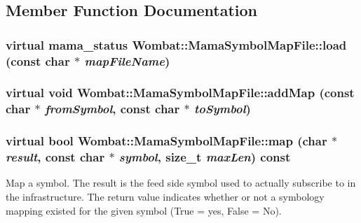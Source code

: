 \subsection{Member Function Documentation}
\hypertarget{classWombat_1_1MamaSymbolMapFile_a1a3f81e006bb46a98cb0920308d7c667}{
\subsubsection[{load}]{\setlength{\rightskip}{0pt plus 5cm}virtual mama\_\-status Wombat::MamaSymbolMapFile::load (const char $\ast$ {\em mapFileName})}}
\label{classWombat_1_1MamaSymbolMapFile_a1a3f81e006bb46a98cb0920308d7c667}
\hypertarget{classWombat_1_1MamaSymbolMapFile_ae5126c3985633b7bf9c7f5b06d505e45}{
\subsubsection[{addMap}]{\setlength{\rightskip}{0pt plus 5cm}virtual void Wombat::MamaSymbolMapFile::addMap (const char $\ast$ {\em fromSymbol}, \/  const char $\ast$ {\em toSymbol})}}
\label{classWombat_1_1MamaSymbolMapFile_ae5126c3985633b7bf9c7f5b06d505e45}
\hypertarget{classWombat_1_1MamaSymbolMapFile_afbc6713633e4748ce4d35c9fbaac2721}{
\subsubsection[{map}]{\setlength{\rightskip}{0pt plus 5cm}virtual bool Wombat::MamaSymbolMapFile::map (char $\ast$ {\em result}, \/  const char $\ast$ {\em symbol}, \/  size\_\-t {\em maxLen}) const}}
\label{classWombat_1_1MamaSymbolMapFile_afbc6713633e4748ce4d35c9fbaac2721}


Map a symbol. The result is the feed side symbol used to actually subscribe to in the infrastructure. The return value indicates whether or not a symbology mapping existed for the given symbol (True = yes, False = No). 


